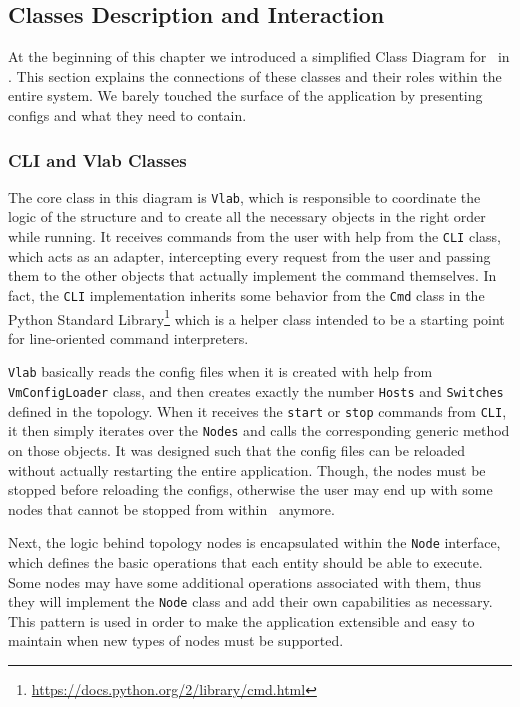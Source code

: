 \subsection{Classes Description and Interaction}
\label{sub-sec:classes-description-interaction}

At the beginning of this chapter we introduced a simplified Class Diagram for \project\ in .
This section explains the connections of these classes and their roles within the entire system.
We barely touched the surface of the application by presenting configs and what they need to contain.

\subsubsection{CLI and Vlab Classes}
\label{sub-sub-sec:cli-vlab-classes}

The core class in this diagram is \texttt{Vlab}, which is responsible to coordinate the logic of the structure and to create all the necessary objects in the right order while running.
It receives commands from the user with help from the \texttt{CLI} class, which acts as an adapter, intercepting every request from the user and passing them to the other objects that actually implement the command themselves.
In fact, the \texttt{CLI} implementation inherits some behavior from the \texttt{Cmd} class in the Python Standard Library\footnote{\url{https://docs.python.org/2/library/cmd.html}} which is a helper class intended to be a starting point for line-oriented command interpreters.

\texttt{Vlab} basically reads the config files when it is created with help from \texttt{VmConfigLoader} class, and then creates exactly the number \texttt{Hosts} and \texttt{Switches} defined in the topology.
When it receives the \texttt{start} or \texttt{stop} commands from \texttt{CLI}, it then simply iterates over the \texttt{Nodes} and calls the corresponding generic method on those objects.
It was designed such that the config files can be reloaded without actually restarting the entire application.
Though, the nodes must be stopped before reloading the configs, otherwise the user may end up with some nodes that cannot be stopped from within \project\ anymore.

Next, the logic behind topology nodes is encapsulated within the \texttt{Node} interface, which defines the basic operations that each entity should be able to execute.
Some nodes may have some additional operations associated with them, thus they will implement the \texttt{Node} class and add their own capabilities as necessary.
This pattern is used in order to make the application extensible and easy to maintain when new types of nodes must be supported.

